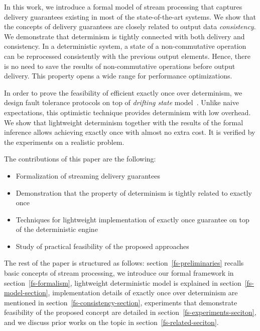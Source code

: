 In this work, we introduce a formal model of stream processing that captures delivery guarantees existing in most of the state-of-the-art systems. We show that the concepts of delivery guarantees are closely related to output data {\em consistency}. We demonstrate that determinism is tightly connected with both delivery and consistency. In a deterministic system, a state of a non-commutative operation can be reprocessed consistently with the previous output elements. Hence, there is no need to save the results of non-commutative operations before output delivery. This property opens a wide range for performance optimizations.

In order to prove the feasibility of efficient exactly once over determinism, we design fault tolerance protocols on top of {\em drifting state} model~\cite{we2018adbis}. Unlike naive expectations, this optimistic technique provides determinism with low overhead. We show that lightweight determinism together with the results of the formal inference allows achieving exactly once with almost no extra cost. It is verified by the experiments on a realistic problem.

The contributions of this paper are the following: 
\begin{itemize}
    \item Formalization of streaming delivery guarantees 
    \item Demonstration that the property of determinism is tightly related to exactly once
    \item Techniques for lightweight implementation of exactly once guarantee on top of the deterministic engine
    \item Study of practical feasibility of the proposed approaches
\end{itemize}

The rest of the paper is structured as follows: section~\ref{fs-preliminaries} recalls basic concepts of stream processing, we introduce our formal framework in section~\ref{fs-formalism}, lightweight deterministic model is explained in section~\ref{fs-model-section}, implementation details of exactly once over determinism are mentioned in section~\ref{fs-consistency-section}, experiments that demonstrate feasibility of the proposed concept are detailed in section~\ref{fs-experiments-seciton}, and we discuss prior works on the topic in section~\ref{fs-related-seciton}. 